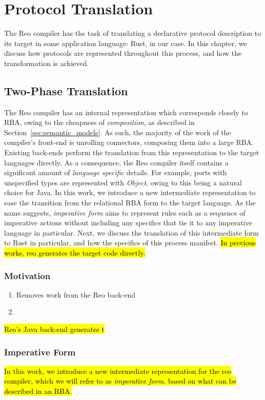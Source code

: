 \chapter{Protocol Translation}
The Reo compiler has the task of translating a declarative protocol description to its target in some application language: Rust, in our case. In this chapter, we discuss how protocols are represented throughout this process, and how the transformation is achieved. 

\section{Two-Phase Translation}
The Reo compiler has an internal representation which corresponds closely to RBA, owing to the cheapness of \textit{composition}, as described in Section~\ref{sec:semantic_models}. As such, the majority of the work of the compiler's front-end is unrolling connectors, composing them into a large RBA. Existing back-ends perform the translation from this representation to the target languages directly. As a consequence, the Reo compiler itself contains a significant amount of \textit{language specific} details. For example, ports with unspecified types are represented with \textit{Object}, owing to this being a natural choice for Java. In this work, we introduce a new intermediate representation to ease the transition from the relational RBA form to the target language. As the name suggests, \textit{imperative form} aims to represent rules each as a sequence of imperative actions without including any specifics that tie it to any imperative language in particular. Next, we discuss the translation of this intermediate form to Rust in particular, and how the specifics of this process manifest. 
\hl{In previous works, reo generates the target code directly. }

\subsection{Motivation}
\begin{enumerate}
\item Removes work from the Reo back-end
\item 
\end{enumerate}
\hl{Reo's Java back-end generates t}

\subsection{Imperative Form}
\hl{In this work, we introduce a new intermediate representation for the reo compiler, which we will refer to as \textit{imperative form}. based on what can be described in an RBA. }

